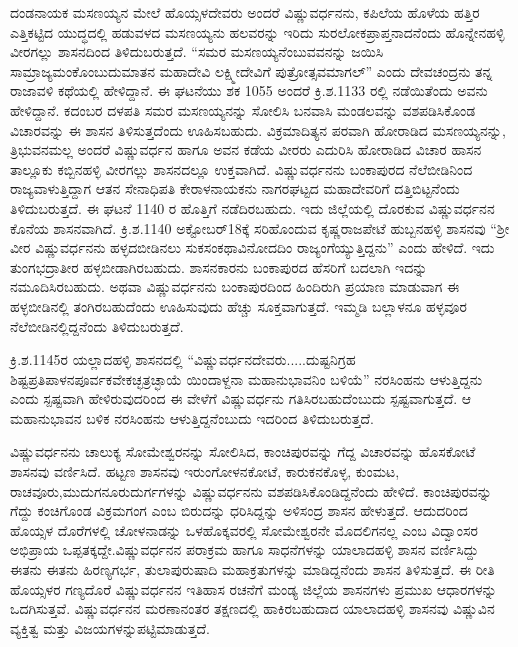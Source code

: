 ದಂಡನಾಯಕ ಮಸಣಯ್ಯನ ಮೇಲೆ ಹೊಯ್ಸಳದೇವರು ಅಂದರೆ ವಿಷ್ಣುವರ್ಧನನು, ಕಪಿಲೆಯ ಹೊಳೆಯ ಹತ್ತಿರ ಎತ್ತಿಕಟ್ಟಿದ ಯುದ್ಧದಲ್ಲಿ ಹಡುವಳದ ಮಸಣಯ್ಯನು ಹಲವರನ್ನು ಇರಿದು ಸುರಲೋಕಪ್ರಾಪ್ತನಾದನೆಂದು ಹೊನ್ನೇನಹಳ್ಳಿ ವೀರಗಲ್ಲು ಶಾಸನದಿಂದ ತಿಳಿದುಬರುತ್ತದೆ. “ಸಮರ ಮಸಣಯ್ಯನೆಂಬುವವನನ್ನು ಜಯಿಸಿ ಸಾಮ್ರಾಜ್ಯಮಂ\break ಕೊಂಬುದುಮಾತನ ಮಹಾದೇವಿ ಲಕ್ಷ್ಮೀದೇವಿಗೆ ಪುತ್ರೋತ್ಸವಮಾಗಲ್​” ಎಂದು ದೇವಚಂದ್ರನು ತನ್ನ ರಾಜಾವಳಿ ಕಥೆಯಲ್ಲಿ ಹೇಳಿದ್ದಾನೆ. ಈ ಘಟನೆಯು ಶಕ 1055 ಅಂದರೆ ಕ್ರಿ.ಶ.1133 ರಲ್ಲಿ ನಡೆಯಿತೆಂದು ಅವನು ಹೇಳಿದ್ದಾನೆ. ಕದಂಬರ ದಳಪತಿ ಸಮರ ಮಸಣಯ್ಯನನ್ನು ಸೋಲಿಸಿ ಬನವಾಸಿ ಮಂಡಲವನ್ನು ವಶಪಡಿಸಿಕೊಂಡ ವಿಚಾರವನ್ನು ಈ ಶಾಸನ ತಿಳಿಸುತ್ತದೆಂದು ಊಹಿಸಬಹುದು. ವಿಕ್ರಮಾದಿತ್ಯನ ಪರವಾಗಿ ಹೋರಾಡಿದ ಮಸಣಯ್ಯನನ್ನು, ತ್ರಿಭುವನಮಲ್ಲ ಅಂದರೆ ವಿಷ್ಣುವರ್ಧನ ಹಾಗೂ ಅವನ ಕಡೆಯ ವೀರರು ಎದುರಿಸಿ ಹೋರಾಡಿದ ವಿಚಾರ ಹಾಸನ ತಾಲ್ಲೂಕು ಕಬ್ಬಿನಹಳ್ಳಿ ವೀರಗಲ್ಲು ಶಾಸನದಲ್ಲೂ ಉಕ್ತವಾಗಿದೆ. ವಿಷ್ಣುವರ್ಧನನು ಬಂಕಾಪುರದ ನೆಲೆಬೀಡಿನಿಂದ ರಾಜ್ಯವಾಳುತ್ತಿದ್ದಾಗ ಆತನ ಸೇನಾಧಿಪತಿ ಕೇರಾಳನಾಯಕನು ನಾಗರಘಟ್ಟದ ಮಹಾದೇವರಿಗೆ ದತ್ತಿಬಿಟ್ಟನೆಂದು ತಿಳಿದುಬರುತ್ತದೆ. ಈ ಘಟನೆ 1140 ರ ಹೊತ್ತಿಗೆ ನಡೆದಿರಬಹುದು. ಇದು ಜಿಲ್ಲೆಯಲ್ಲಿ ದೊರಕುವ ವಿಷ್ಣುವರ್ಧನನ ಕೊನೆಯ ಶಾಸನವಾಗಿದೆ. ಕ್ರಿ.ಶ.1140 ಅಕ್ಟೋಬರ್​ 18ಕ್ಕೆ ಸರಿಹೊಂದುವ ಕೃಷ್ಣರಾಜಪೇಟೆ ಹುಬ್ಬನಹಳ್ಳಿ ಶಾಸನವು “ಶ‍್ರೀ ವೀರ ವಿಷ್ಣುವರ್ಧನನು ಹಳ್ಳದಬೀಡಿನಲು ಸುಕಸಂಕಥಾವಿನೋದದಿಂ ರಾಜ್ಯಂಗೆಯ್ಯುತ್ತಿದ್ದನು” ಎಂದು ಹೇಳಿದೆ. ಇದು ತುಂಗಭದ್ರಾತೀರ ಹಳ್ಳಬೀಡಾಗಿರಬಹುದು. ಶಾಸನಕಾರನು ಬಂಕಾಪುರದ ಹೆಸರಿಗೆ ಬದಲಾಗಿ ಇದನ್ನು ನಮೂದಿಸಿರಬಹುದು. ಅಥವಾ ವಿಷ್ಣುವರ್ಧನನು ಬಂಕಾಪುರದಿಂದ ಹಿಂದಿರುಗಿ ಪ್ರಯಾಣ ಮಾಡುವಾಗ ಈ ಹಳ್ಳಬೀಡಿನಲ್ಲಿ ತಂಗಿರಬಹುದೆಂದು ಊಹಿಸುವುದು ಹೆಚ್ಚು ಸೂಕ್ತವಾಗುತ್ತದೆ. ಇಮ್ಮಡಿ ಬಲ್ಲಾಳನೂ ಹಳ್ಳವೂರ ನೆಲೆಬೀಡಿನಲ್ಲಿದ್ದನೆಂದು ತಿಳಿದುಬರುತ್ತದೆ.

ಕ್ರಿ.ಶ.1145ರ ಯಲ್ಲಾದಹಳ್ಳಿ ಶಾಸನದಲ್ಲಿ “ವಿಷ್ಣುವರ್ಧನದೇವರು.....ದುಷ್ಟನಿಗ್ರಹ ಶಿಷ್ಟಪ್ರತಿಪಾಳನ\break ಪೂರ್ವಕವೇಕಚ್ಛತ್ರಚ್ಛಾಯೆ ಯಿಂದಾಳ್ದನಾ ಮಹಾನುಭಾವನಿಂ ಬಳಿಯೆ” ನರಸಿಂಹನು ಆಳುತ್ತಿದ್ದನು ಎಂದು ಸ್ಪಷ್ಟವಾಗಿ ಹೇಳಿರುವುದರಿಂದ ಈ ವೇಳೆಗೆ ವಿಷ್ಣುವರ್ಧನು ಗತಿಸಿರಬಹುದೆಂಬುದು ಸ್ಪಷ್ಟವಾಗುತ್ತದೆ. ಆ ಮಹಾನುಭಾವನ ಬಳಿಕ ನರಸಿಂಹನು ಆಳುತ್ತಿದ್ದನೆಂಬುದು ಇದರಿಂದ ತಿಳಿದುಬರುತ್ತದೆ.

ವಿಷ್ಣುವರ್ಧನನು ಚಾಲುಕ್ಯ ಸೋಮೇಶ್ವರನನ್ನು ಸೋಲಿಸಿದ, ಕಾಂಚಿಪುರವನ್ನು ಗೆದ್ದ ವಿಚಾರವನ್ನು ಹೊಸಕೋಟೆ ಶಾಸನವು ವರ್ಣಿಸಿದೆ. ಹಟ್ಟಣ ಶಾಸನವು ಇರುಂಗೋಳನಕೋಟೆ, ಕಾರುಕನಕೊಳ್ಳ, ಕುಂಮಟ, ರಾಚವೂರು,\break ಮುದುಗನೂರುದುರ್ಗ\-ಗಳನ್ನು ವಿಷ್ಣುವರ್ಧನನು ವಶಪಡಿಸಿಕೊಂಡಿದ್ದನೆಂದು ಹೇಳಿದೆ. ಕಾಂಚಿಪುರವನ್ನು ಗೆದ್ದು ಕಂಚಿಗೊಂಡ ವಿಕ್ರಮಗಂಗ ಎಂಬ ಬಿರುದನ್ನು ಧರಿಸಿದ್ದನ್ನು ಅಳಿಸಂದ್ರ ಶಾಸನ ಹೇಳುತ್ತದೆ. ಆದುದರಿಂದ ಹೊಯ್ಸಳ ದೊರೆಗಳಲ್ಲಿ ಚೋಳನಾಡನ್ನು ಒಳಹೊಕ್ಕವರಲ್ಲಿ ಸೋಮೇಶ್ವರನೇ ಮೊದಲಿಗನಲ್ಲ ಎಂಬ ವಿದ್ವಾಂಸರ ಅಭಿಪ್ರಾಯ ಒಪ್ಪತಕ್ಕದ್ದೇ.\break ವಿಷ್ಣುವರ್ಧನನ ಪರಾಕ್ರಮ ಹಾಗೂ ಸಾಧನೆಗಳನ್ನು ಯಾಲಾದಹಳ್ಳಿ ಶಾಸನ ವರ್ಣಿಸಿದ್ದು ಈತನು ಈತನು ಹಿರಣ್ಯಗರ್ಭ, ತುಲಾಪುರುಷಾದಿ ಮಹಾಕ್ರತುಗಳನ್ನು ಮಾಡಿದ್ದನೆಂದು ಶಾಸನ ತಿಳಿಸುತ್ತದೆ. ಈ ರೀತಿ ಹೊಯ್ಸಳರ ಗಣ್ಯದೊರೆ ವಿಷ್ಣುವರ್ಧನನ ಇತಿಹಾಸ ರಚನೆಗೆ ಮಂಡ್ಯ ಜಿಲ್ಲೆಯ ಶಾಸನಗಳು ಪ್ರಮುಖ ಆಧಾರಗಳನ್ನು ಒದಗಿಸುತ್ತವೆ. ವಿಷ್ಣುವರ್ಧನನ ಮರಣಾನಂತರ ತಕ್ಷಣದಲ್ಲಿ ಹಾಕಿರಬಹುದಾದ ಯಾಲಾದಹಳ್ಳಿ ಶಾಸನವು ವಿಷ್ಣುವಿನ ವ್ಯಕ್ತಿತ್ವ ಮತ್ತು ವಿಜಯಗಳನ್ನು\break ಪಟ್ಟಿಮಾಡುತ್ತದೆ.

